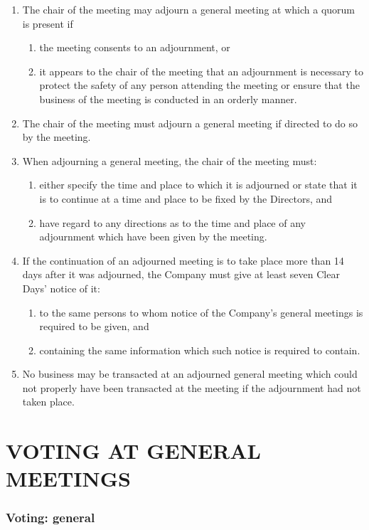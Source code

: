 \documentclass[a4paper,12pt]{article}
\begin{document}
\begin{enumerate}
  \item The chair of the meeting may adjourn a general meeting at which a quorum is present if
  \begin{enumerate}
    \item the meeting consents to an adjournment, or
    \item it appears to the chair of the meeting that an adjournment is necessary to protect the safety of any person attending the meeting or ensure that the business of the meeting is conducted in an orderly manner.
  \end{enumerate}
  \item The chair of the meeting must adjourn a general meeting if directed to do so by the meeting.
  \item When adjourning a general meeting, the chair of the meeting must:
  \begin{enumerate}
    \item either specify the time and place to which it is adjourned or state that it is to continue at a time and place to be fixed by the Directors, and
    \item have regard to any directions as to the time and place of any adjournment which have been given by the meeting.
  \end{enumerate}
  \item If the continuation of an adjourned meeting is to take place more than 14 days after it was adjourned, the Company must give at least seven Clear Days’ notice of it:
  \begin{enumerate}
    \item to the same persons to whom notice of the Company’s general meetings is required to be given, and
    \item containing the same information which such notice is required to contain.
  \end{enumerate}
  \item No business may be transacted at an adjourned general meeting which could not properly have been transacted at the meeting if the adjournment had not taken place.
\end{enumerate}

\part*{VOTING AT GENERAL MEETINGS}

\section{Voting: general}
\end{document}
